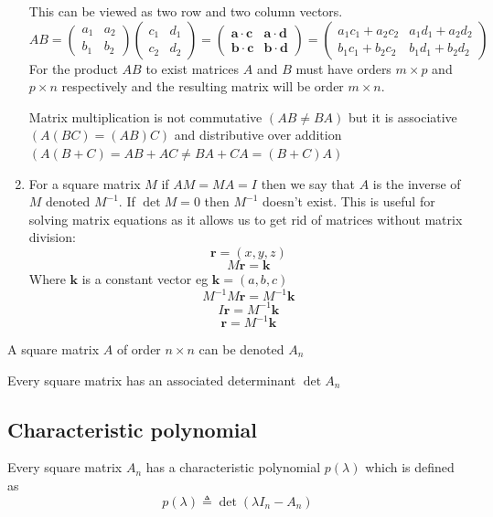 \documentclass{article}
\renewcommand{\vec}[1]{\bm{#1}}
\newcommand{\vv}[1]{\vec{#1}}
\begin{document}
\begin{enumerate}
\[\]
This can be viewed as two row and two column vectors.
\[AB=
\begin{pmatrix}
a_1 & a_2\\
b_1 & b_2
\end{pmatrix}
\begin{pmatrix}
c_1 & d_1\\
c_2 & d_2
\end{pmatrix}
=
\begin{pmatrix}
\vv a\cdot \vv c & \vv a\cdot \vv d\\
\vv b \cdot \vv c & \vv b\cdot \vv d
\end{pmatrix}
=
\begin{pmatrix}
a_1c_1+a_2c_2 & a_1 d_1+a_2d_2\\
b_1c_1+b_2c_2 & b_1d_1+b_2d_2
\end{pmatrix}
\]
For the product \(AB\) to exist matrices \(A\) and \(B\) must have orders \(m\times p\) and \(p\times n\) respectively and the resulting matrix will be order \(m\times n\).

Matrix multiplication is not commutative \((AB\ne BA)\) but it is associative \((A(BC)=(AB)C)\) and distributive over addition \((A(B+C)=AB+AC\ne BA+CA=(B+C)A)\) 

\item For a square matrix \(M\) if \(AM=MA=I\) then we say that \(A\) is the inverse of \(M\) denoted \(M^{-1}\). If \(\det M=0\) then \(M^{-1}\) doesn't exist. This is useful for solving matrix equations as it allows us to get rid of matrices without matrix division:
\[\vv r=(x,y,z)\]
\[M\vv r=\vv k\]
Where \(\vv k\) is a constant vector eg \(\vv k=(a,b,c)\)
\[M^{-1}M\vv r=M^{-1}\vv k\]
\[I\vv r=M^{-1}\vv k\]
\[\vv r=M^{-1}\vv k\]
\end{enumerate}

A square matrix \(A\) of order \(n\times n\) can be denoted \(A_n\)

Every square matrix has an associated determinant \(\det A_n\)

\subsection*{Characteristic polynomial}

Every square matrix \(A_n\) has a characteristic polynomial \(p(\lambda)\) which is defined as
\[p(\lambda)\triangleq\det(\lambda I_n-A_n)\]
\end{document}
